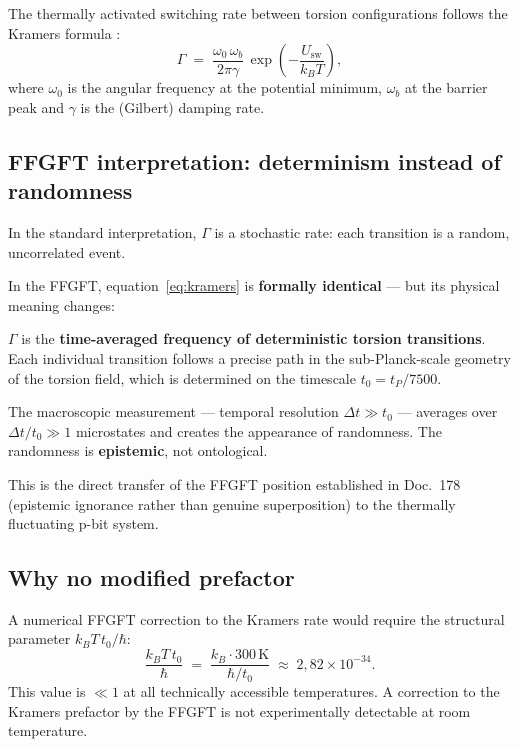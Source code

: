	The thermally activated switching rate between torsion configurations
	follows the Kramers formula \cite{Kramers1940, Hanggi1990}:
	\begin{equation}
		\Gamma \;=\; \frac{\omega_0\,\omega_b}{2\pi\gamma}
		\,\exp\!\left(-\frac{U_\text{sw}}{k_B T}\right),
		\label{eq:kramers}
	\end{equation}
	where $\omega_0$ is the angular frequency at the potential minimum,
	$\omega_b$ at the barrier peak and $\gamma$ is the (Gilbert) damping rate.
	
	\subsection{FFGFT interpretation: determinism instead of randomness}
	\label{subsec:kramers-ffgft}
	
	In the standard interpretation, $\Gamma$ is a stochastic rate:
	each transition is a random, uncorrelated event.
	
	\begin{foundation}
		In the FFGFT, equation~\eqref{eq:kramers} is \textbf{formally identical}
		--- but its physical meaning changes:
		
		$\Gamma$ is the \textbf{time-averaged frequency of deterministic
			torsion transitions}. Each individual transition follows a precise
		path in the sub-Planck-scale geometry of the torsion field,
		which is determined on the timescale $t_0 = t_P/7500$.
		
		The macroscopic measurement --- temporal resolution $\Delta t \gg t_0$ ---
		averages over $\Delta t/t_0 \gg 1$ microstates and creates
		the appearance of randomness. The randomness is \textbf{epistemic},
		not ontological.
		
		This is the direct transfer of the FFGFT position established in
		Doc.~178 (epistemic ignorance rather than genuine superposition)
		to the thermally fluctuating p-bit system.
	\end{foundation}
	
	\subsection{Why no modified prefactor}
	\label{subsec:no-prefactor}
	
	A numerical FFGFT correction to the Kramers rate would require the
	structural parameter $k_BT\,t_0/\hbar$:
	\begin{equation}
		\frac{k_B T\,t_0}{\hbar}
		\;=\; \frac{k_B \cdot 300\,\text{K}}{\hbar/t_0}
		\;\approx\; 2{,}82 \times 10^{-34}.
		\label{eq:structural-parameter}
	\end{equation}
	This value is $\ll 1$ at all technically accessible temperatures.
	A correction to the Kramers prefactor by the FFGFT is not
	experimentally detectable at room temperature.
	
